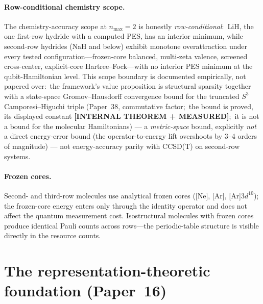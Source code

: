 \documentclass[aps,pra,twocolumn,superscriptaddress,longbibliography]{revtex4-2}
\newcommand{\gvc}[2]{#2}
\begin{document}
\paragraph{Row-conditional chemistry scope.}
The chemistry-accuracy scope at $n_{\max}=2$ is honestly
\emph{row-conditional}:\ LiH, the one first-row hydride with a computed
PES, has an interior minimum, while second-row hydrides (NaH and
below) exhibit monotone overattraction under every tested
configuration---frozen-core balanced, multi-zeta valence, screened
cross-center, explicit-core Hartree--Fock---with no interior PES minimum
at the qubit-Hamiltonian level.  This scope boundary is documented
empirically, not papered over:\ the framework's value proposition is
structural sparsity together with \gvc{wh1-p38-gh-convergence}{a state-space Gromov--Hausdorff
convergence bound for the truncated $S^3$ Camporesi--Higuchi triple (Paper~38, commutative factor;\ the bound is proved, its displayed constant
\textbf{[INTERNAL THEOREM + MEASURED]};\ it is not a bound for the molecular
Hamiltonians)} --- a \emph{metric-space} bound, explicitly
\emph{not} a direct energy-error bound (the operator-to-energy lift
overshoots by 3--4 orders of magnitude) --- not energy-accuracy parity with
CCSD(T) on second-row systems.

\paragraph{Frozen cores.}
Second- and third-row molecules use analytical frozen cores ([Ne], [Ar],
[Ar]$3d^{10}$); the frozen-core energy enters only through the identity
operator and does not affect the quantum measurement cost.
Isostructural molecules with frozen cores produce identical Pauli counts
across rows---the periodic-table structure is visible directly in the
resource counts.

\section{The representation-theoretic foundation (Paper~16)}
\end{document}
